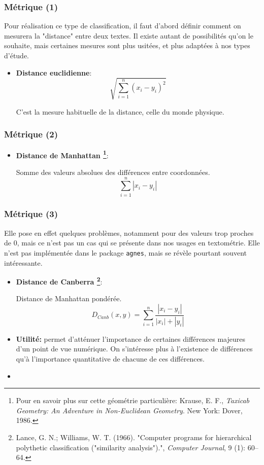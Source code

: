 \documentclass{beamer}
\begin{document}
\begin{frame}[fragile]
\frametitle{Métrique (1)}

Pour réalisation ce type de classification, il faut d'abord définir comment on mesurera la "distance" entre deux textes. Il existe autant de possibilités qu'on le souhaite, mais certaines mesures sont plus usitées, et plus adaptées à nos types d'étude.

\begin{itemize}
\item \textbf{Distance euclidienne}:
\[
\sqrt{\sum_{i=1}^{n} \left( x_{i}-y_{i}\right)^{2}}
\]

C'est la mesure habituelle de la distance, celle du monde physique.  

\end{itemize}

\end{frame}

\begin{frame}[fragile]
\frametitle{Métrique (2)}

\begin{itemize}
\item \textbf{Distance de Manhattan \footnote{Pour en savoir plus sur cette géométrie particulière: Krause, E. F., \textit{Taxicab Geometry: An Adventure in Non-Euclidean Geometry}. New York: Dover, 1986. }}:

Somme des valeurs absolues des différences entre coordonnées.
\[
\sum_{i=1}^{n} |x_{i}-y_{i}|
\]



\end{itemize}

\end{frame}

\begin{frame}[fragile]
\frametitle{Métrique (3)}

Elle pose en effet quelques problèmes, notamment pour des valeurs trop proches de 0, mais ce n'est pas un cas qui se présente dans nos usages en textométrie. Elle n'est pas implémentée dans le package \texttt{agnes}, mais se révèle pourtant souvent intéressante.

\begin{itemize}
\item \textbf{Distance de Canberra \footnote{Lance, G. N.; Williams, W. T. (1966). "Computer programs for hierarchical polythetic classification ("similarity analysis").", \textit{Computer Journal}, 9 (1): 60–64. }}:

Distance de Manhattan pondérée.
\[
D_{Canb} (x,y) = \sum_{i=1}^{n} \frac{|x_{i}-y_{i}|}{|x_{i}|+|y_{i}|}
\]

\item \textbf{Utilité:} permet d'atténuer l'importance de certaines différences majeures d'un point de vue numérique. On s'intéresse plus à l'existence de différences qu'à l'importance quantitative de chacune de ces différences.

\item 
\end{itemize}




\end{frame}
\end{document}
